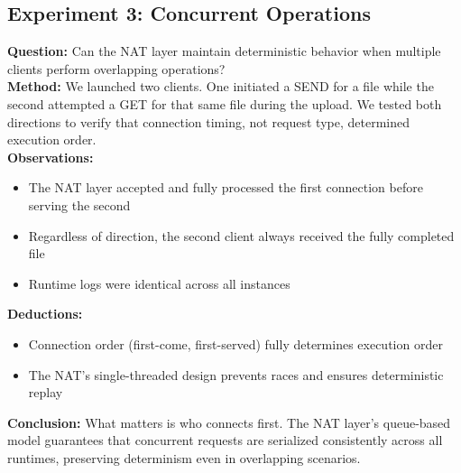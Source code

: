 \documentclass[10pt]{IEEEtran}
\begin{document}
\subsection{Experiment 3: Concurrent Operations}
\textbf{Question:} Can the NAT layer maintain deterministic behavior when multiple clients perform overlapping operations? \\
\textbf{Method:} We launched two clients. One initiated a SEND for a file while the second attempted a GET for that same file during the upload. We tested both directions to verify that connection timing, not request type, determined execution order. \\
\textbf{Observations:}
\begin{itemize}
    \item The NAT layer accepted and fully processed the first connection before serving the second
    \item Regardless of direction, the second client always received the fully completed file
    \item Runtime logs were identical across all instances
\end{itemize}
\textbf{Deductions:}
\begin{itemize}
    \item Connection order (first-come, first-served) fully determines execution order
    \item The NAT's single-threaded design prevents races and ensures deterministic replay
\end{itemize}
\textbf{Conclusion:} What matters is who connects first. The NAT layer's queue-based model guarantees that concurrent requests are serialized consistently across all runtimes, preserving determinism even in overlapping scenarios.
\end{document}
